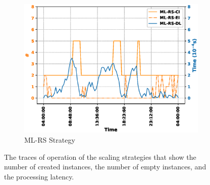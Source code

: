 \documentclass[conference, final]{IEEEtran}
\begin{document}
{\begin{figure}
\begin{subfigure}[h]{0.32\linewidth}
\includegraphics[width=\linewidth]{./figures/ML-RSinstance_trace.eps}
\caption{{\textsf{ML-RS}} Strategy}
\end{subfigure}
\caption{The traces of operation of the scaling strategies that show the number of created instances, the number of empty instances, and the processing latency.}
\label{fig:instance_trace}
\end{figure}


}
\end{document}
